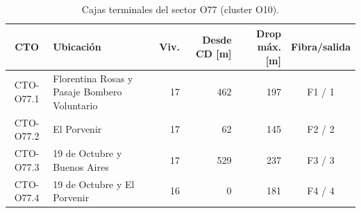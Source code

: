 \begin{table}[H]\centering\footnotesize
\caption{Cajas terminales del sector O77 (cluster O10).}\label{tab:sectorO77}
\begin{tabular}{|c|p{4.0cm}|r|r|r|c|}\hline \textbf{CTO} & \textbf{Ubicación} & \textbf{Viv.} & \textbf{Desde CD [m]} & \textbf{Drop máx. [m]} & \textbf{Fibra/salida} \\ \hline
CTO-O77.1 & Florentina Rosas y Pasaje Bombero Voluntario & 17 & 462 & 197 & F1 / 1 \\ \hline
CTO-O77.2 & El Porvenir & 17 & 62 & 145 & F2 / 2 \\ \hline
CTO-O77.3 & 19 de Octubre y Buenos Aires & 17 & 529 & 237 & F3 / 3 \\ \hline
CTO-O77.4 & 19 de Octubre y El Porvenir & 16 & 0 & 181 & F4 / 4 \\ \hline
\end{tabular}\end{table}
